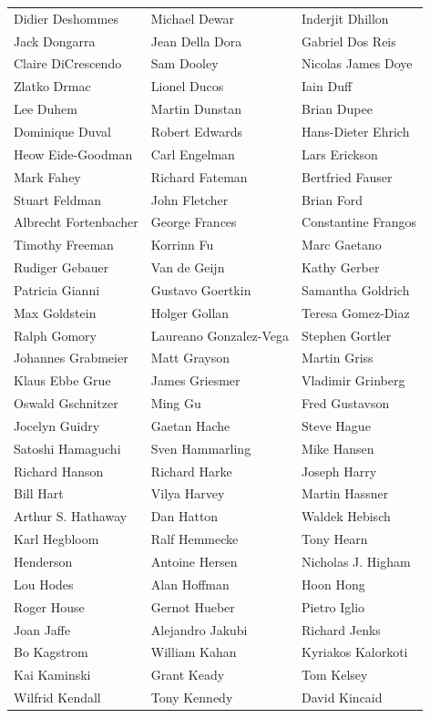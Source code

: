 \begin{tabular}{lll}
Didier Deshommes       & Michael Dewar          & Inderjit Dhillon\\
Jack Dongarra          & Jean Della Dora        & Gabriel Dos Reis\\
Claire DiCrescendo     & Sam Dooley             & Nicolas James Doye\\
Zlatko Drmac           & Lionel Ducos           & Iain Duff\\
Lee Duhem              & Martin Dunstan         & Brian Dupee\\
Dominique Duval        & Robert Edwards         & Hans-Dieter Ehrich\\
Heow Eide-Goodman      & Carl Engelman          & Lars Erickson\\
Mark Fahey             & Richard Fateman        & Bertfried Fauser\\
Stuart Feldman         & John Fletcher          & Brian Ford\\
Albrecht Fortenbacher  & George Frances         & Constantine Frangos\\
Timothy Freeman        & Korrinn Fu             & Marc Gaetano\\
Rudiger Gebauer        & Van de Geijn           & Kathy Gerber\\
Patricia Gianni        & Gustavo Goertkin       & Samantha Goldrich\\
Max Goldstein          & Holger Gollan          & Teresa Gomez-Diaz\\
Ralph Gomory           & Laureano Gonzalez-Vega & Stephen Gortler\\
Johannes Grabmeier     & Matt Grayson           & Martin Griss\\
Klaus Ebbe Grue        & James Griesmer         & Vladimir Grinberg\\
Oswald Gschnitzer      & Ming Gu                & Fred Gustavson\\
Jocelyn Guidry         & Gaetan Hache           & Steve Hague\\
Satoshi Hamaguchi      & Sven Hammarling        & Mike Hansen\\
Richard Hanson         & Richard Harke          & Joseph Harry\\
Bill Hart              & Vilya Harvey           & Martin Hassner\\
Arthur S. Hathaway     & Dan Hatton             & Waldek Hebisch\\
Karl Hegbloom          & Ralf Hemmecke          & Tony Hearn\\
Henderson              & Antoine Hersen         & Nicholas J. Higham\\
Lou Hodes              & Alan Hoffman           & Hoon Hong\\
Roger House            & Gernot Hueber          & Pietro Iglio\\
Joan Jaffe             & Alejandro Jakubi       & Richard Jenks\\
Bo Kagstrom            & William Kahan          & Kyriakos Kalorkoti\\
Kai Kaminski           & Grant Keady            & Tom Kelsey\\
Wilfrid Kendall        & Tony Kennedy           & David Kincaid\\
\end{tabular}
